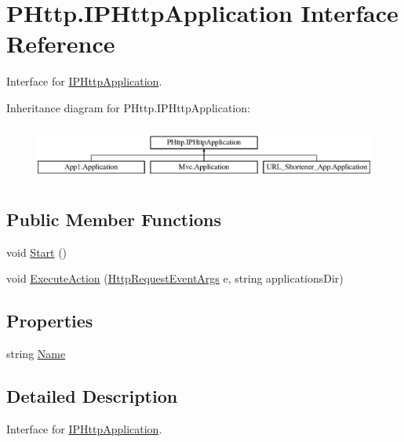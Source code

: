 \hypertarget{interface_p_http_1_1_i_p_http_application}{}\section{P\+Http.\+I\+P\+Http\+Application Interface Reference}
\label{interface_p_http_1_1_i_p_http_application}


Interface for \hyperlink{interface_p_http_1_1_i_p_http_application}{I\+P\+Http\+Application}.  


Inheritance diagram for P\+Http.\+I\+P\+Http\+Application\+:\begin{figure}[H]
\begin{center}
\leavevmode
\includegraphics[height=1.839080cm]{interface_p_http_1_1_i_p_http_application}
\end{center}
\end{figure}
\subsection*{Public Member Functions}
\begin{DoxyCompactItemize}
\item 
void \hyperlink{interface_p_http_1_1_i_p_http_application_a81b018098725b8cc313ce5477309ebb6}{Start} ()
\item 
void \hyperlink{interface_p_http_1_1_i_p_http_application_aed94c85887acef0a6a903d7783a78c4b}{Execute\+Action} (\hyperlink{class_p_http_1_1_http_request_event_args}{Http\+Request\+Event\+Args} e, string applications\+Dir)
\end{DoxyCompactItemize}
\subsection*{Properties}
\begin{DoxyCompactItemize}
\item 
string \hyperlink{interface_p_http_1_1_i_p_http_application_ae3054b9404873161ceca4db51e38ebc0}{Name}
\end{DoxyCompactItemize}


\subsection{Detailed Description}
Interface for \hyperlink{interface_p_http_1_1_i_p_http_application}{I\+P\+Http\+Application}. 

